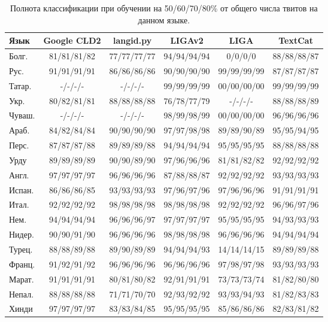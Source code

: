 \documentclass[a4paper, 14pt]{article}
\begin{document}
\begin{center}
\begin{table}
\begin{tabular*}{1.07\textwidth}{| l| *{5}{|c} |}
\hline 
Язык & Google CLD2 & langid.py & LIGAv2 & LIGA & TextCat \\
\hline
\hline
Болг. & 81/81/81/82 & 77/77/77/77 & 94/94/94/94 & 0/0/0/0 & 88/88/88/87 \\
Рус. & 91/91/91/91 & 86/86/86/86 & 90/90/90/90 & 99/99/99/99 & 87/87/87/87 \\
Татар. & -/-/-/- & -/-/-/- & 99/99/99/99 & 00/00/00/00 & 99/99/99/99 \\
Укр. & 80/82/81/81 & 88/88/88/88 & 76/78/77/79 & -/-/-/- & 88/88/88/89 \\
Чуваш. & -/-/-/- & -/-/-/- & 98/99/98/99 & 00/00/00/00 & 96/96/96/96 \\
\hline
\hline
Араб. & 84/82/84/84 & 90/90/90/90 & 97/97/98/98 & 89/89/90/89 & 95/95/94/95 \\
Перс. & 87/87/87/88 & 89/89/89/88 & 94/94/94/94 & 95/95/95/95 & 88/88/88/88 \\
Урду & 89/89/89/89 & 90/90/89/90 & 97/96/96/96 & 81/81/82/82 & 92/92/92/92 \\
\hline
\hline
Англ. & 97/97/97/97 & 96/96/96/96 & 87/88/88/87 & 92/92/92/92 & 93/93/93/93 \\
Испан. & 86/86/86/85 & 93/93/93/93 & 97/96/97/96 & 97/96/96/96 & 91/91/91/91 \\
Итал. & 92/92/92/92 & 98/98/98/98 & 98/98/98/98 & 92/92/92/92 & 96/96/97/96 \\
Нем. & 94/94/94/94 & 96/96/96/97 & 97/97/97/97 & 95/95/95/95 & 94/93/93/93 \\
Нидер. & 90/90/91/90 & 96/96/96/96 & 98/98/98/98 & 96/96/96/96 & 94/94/94/94 \\
Турец. & 88/88/89/88 & 89/90/89/89 & 94/94/94/93 & 14/14/14/15 & 89/89/89/88 \\
Франц. & 91/92/91/92 & 96/96/96/96 & 96/96/96/96 & 97/98/97/98 & 93/93/93/93 \\
\hline
\hline
Марат. & 91/91/91/91 & 80/81/80/82 & 92/91/91/91 & 73/73/73/74 & 81/82/80/80 \\
Непал. & 88/88/88/88 & 71/71/70/70 & 92/93/92/92 & 93/93/94/93 & 81/82/83/83 \\
Хинди & 97/97/97/97 & 83/83/84/85 & 95/95/95/95 & 85/86/86/86 & 82/83/81/82 \\
\hline
\end{tabular*}
\caption{Полнота классификации при обучении на 50/60/70/80\% от общего числа твитов на данном языке.}
\end{table}
\end{center}
\end{document}
